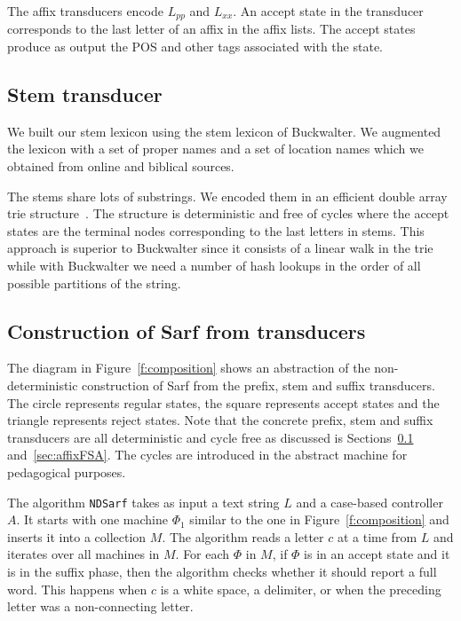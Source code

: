 \documentclass[11pt]{article}
\newcommand{\CodeIn}[1]{{\small\texttt{#1}}}
\begin{document}
The affix transducers encode $L_{pp}$ and
$L_{xx}$.
An accept state in the transducer corresponds to the last letter 
of an affix in the affix lists.
The accept states produce as output the POS and other tags
associated with the state.

\subsection{Stem transducer}
\label{sec:stemFSA}

We built our stem lexicon using the stem lexicon of 
Buckwalter. 
We augmented the lexicon with a set of proper names and
a set of location names which we 
obtained from online and biblical sources. 

The stems share lots of substrings. We encoded them in
an efficient double array trie structure~\cite{Aoe:89}. 
The structure is deterministic and free of cycles where the 
accept states are the terminal nodes corresponding to the last 
letters in stems. 
This approach is superior to Buckwalter since it consists of
a linear walk in the trie while with Buckwalter we need
a number of hash lookups in the order of all possible partitions
of the string.

\subsection{Construction of Sarf from transducers}
\label{sec:ndfsa}

The diagram in Figure~\ref{f:composition} shows an 
abstraction of the non-deterministic construction of Sarf
from the prefix, stem and suffix transducers. 
The circle represents regular states, the square
represents accept states and the triangle represents
reject states. 
Note that the concrete prefix, stem and suffix transducers
are all deterministic and cycle free as discussed 
is Sections~\ref{sec:stemFSA} and~\ref{sec:affixFSA}.
The cycles are introduced in the abstract machine
for pedagogical purposes.

\begin{figure}[tb]
\end{figure}

The algorithm \CodeIn{NDSarf} 
takes as input a text string $L$ and a case-based controller
$A$. 
It starts with one machine $\Phi_1$ similar to the one in 
Figure~\ref{f:composition} and inserts it into a collection
$M$. 
The algorithm reads a letter $c$ at a time from $L$
and iterates over all machines in $M$. 
For each $\Phi$ in $M$,
if $\Phi$ is in an accept state and it is in the suffix
phase, then the algorithm checks whether it should report
a full word. 
This happens when $c$ is a white space, a delimiter, 
or when the preceding letter %
was a non-connecting letter. 
\end{document}
